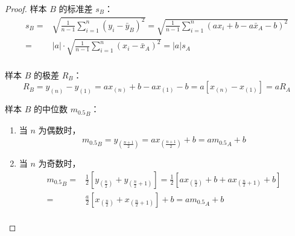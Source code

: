 \documentclass[normal,cn]{elegantnote}
\begin{document}
\begin{enumerate}
\begin{proof}
            样本 $B$ 的标准差 $s_{B}$：
            \begin{equation*}
                \begin{aligned}
                    s_{B}= & \sqrt{\frac{1}{n-1} \sum_{i=1}^{n}\left(y_{i}-\bar{y}_{B}\right)^{2}}=\sqrt{\frac{1}{n-1} \sum_{i=1}^{n}\left(a x_{i}+b-a \bar{x}_{A}-b\right)^{2}} \\
                    =      & |a| \cdot \sqrt{\frac{1}{n-1} \sum_{i=1}^{n}\left(x_{i}-\bar{x}_{A}\right)^{2}}=|a| s_{A}                                                           \\
                \end{aligned}
            \end{equation*}

            样本 $B$ 的极差 $R_{B}$：
            \begin{equation*}
                R_{B}=y_{(n)}-y_{(1)}=a x_{(n)}+b-a x_{(1)}-b=a\left[x_{(n)}-x_{(1)}\right]=a R_{A}
            \end{equation*}

            样本 $B$ 的中位数 ${m_{0.5}}_{B}$：

            \begin{enumerate}
                \item 当 $n$ 为偶数时，
                      \begin{equation*}
                          {m_{0.5}}_{B}=y_{\left(\frac{n+1}{2}\right)}=a x_{\left(\frac{n+1}{2}\right)}+b=a{m_{0.5}}_{A}+b
                      \end{equation*}
                \item 当 $n$ 为奇数时，
                      \begin{equation*}
                          \begin{aligned}
                              {m_{0.5}}_{B}= & \frac{1}{2}\left[y_{\left(\frac{n}{2}\right)}+y_{\left(\frac{n}{2}+1\right)}\right]=\frac{1}{2}\left[a x_{\left(\frac{n}{2}\right)}+b+a x_{\left(\frac{n}{2}+1\right)}+b\right] \\
                              =              & \frac{a}{2}\left[x_{\left(\frac{n}{2}\right)}+x_{\left(\frac{n}{2}+1\right)}\right]+b=a {m_{0.5}}_A+b                                                                           \\
                          \end{aligned}
                      \end{equation*}
            \end{enumerate}


\end{proof}
\end{enumerate}
\end{document}

